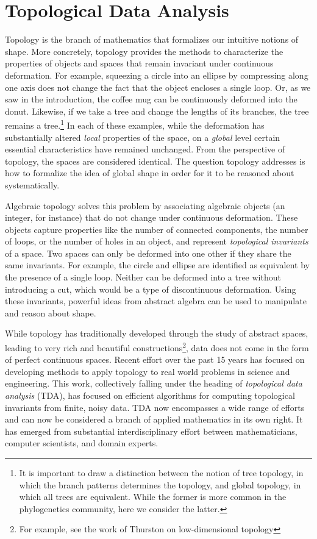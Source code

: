\section{Topological Data Analysis}
\label{bg:tda}

Topology is the branch of mathematics that formalizes our intuitive notions of shape.
More concretely, topology provides the methods to characterize the properties of objects and spaces that remain invariant under continuous deformation.
For example, squeezing a circle into an ellipse by compressing along one axis does not change the fact that the object encloses a single loop.
Or, as we saw in the introduction, the coffee mug can be continuously deformed into the donut.
Likewise, if we take a tree and change the lengths of its branches, the tree remains a tree.\footnote{It is important to draw a distinction between the notion of tree topology, in which the branch patterns determines the topology, and global topology, in which all trees are equivalent. While the former is more common in the phylogenetics community, here we consider the latter.}
In each of these examples, while the deformation has substantially altered \emph{local} properties of the space, on a \emph{global} level certain essential characteristics have remained unchanged.
From the perspective of topology, the spaces are considered identical.
The question topology addresses is how to formalize the idea of global shape in order for it to be reasoned about systematically.

Algebraic topology solves this problem by associating algebraic objects (an integer, for instance) that do not change under continuous deformation.
These objects capture properties like the number of connected components, the number of loops, or the number of holes in an object, and represent \emph{topological invariants} of a space.
Two spaces can only be deformed into one other if they share the same invariants.
For example, the circle and ellipse are identified as equivalent by the presence of a single loop.
Neither can be deformed into a tree without introducing a cut, which would be a type of discontinuous deformation.
Using these invariants, powerful ideas from abstract algebra can be used to manipulate and reason about shape.

While topology has traditionally developed through the study of abstract spaces, leading to very rich and beautiful constructions\footnote{For example, see the work of Thurston on low-dimensional topology}, data does not come in the form of perfect continuous spaces.
Recent effort over the past 15 years has focused on developing methods to apply topology to real world problems in science and engineering.
This work, collectively falling under the heading of \emph{topological data analysis} (TDA), has focused on efficient algorithms for computing topological invariants from finite, noisy data.
TDA now encompasses a wide range of efforts and can now be considered a branch of applied mathematics in its own right.
It has emerged from substantial interdisciplinary effort between mathematicians, computer scientists, and domain experts.

